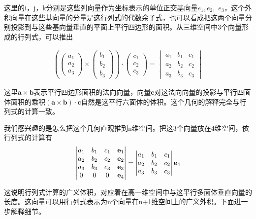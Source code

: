 	这里的i，j，k分别是这些列向量作为坐标表示的单位正交基向量$ e_1,e_2,$  $e_3 $，这个外积向量在这些基向量的分量是这行列式的代数余子式，也可以看成把这两个向量分别投影到与这些基向量垂直的平面上平行四边形的面积。从三维空间中3个向量形成的行列式，可以推出
	
	\begin{gather*}
		\left (  \begin{pmatrix}a_1\\a_2\\a_3 \end{pmatrix} \times \begin{pmatrix}b_1\\b_2\\b_3 \end{pmatrix}\right )\cdot \begin{pmatrix}c_1\\c_2\\c_3 \end{pmatrix} = \begin{vmatrix}a_1&b_1&c_1 \\a_2& b_2&c_2\\a_3&b_3&c_3 \end{vmatrix}
	\end{gather*}

	这里$ \mathbf{a }\times \mathbf{ b} $表示平行四边形面积的法向向量，向量$ \mathbf{c} $对这法向向量的投影与平行四面体面积的乘积$ (\mathbf{a} \times\mathbf{b})\cdot\mathbf{c}$自然是这平行六面体的体积。这个几何的解释完全与行列式的计算一致。
	
	我们感兴趣的是怎么把这个几何直观推到n维空间。把这3个向量放在4维空间，依行列式的计算有
	\begin{gather*}
		\begin{vmatrix}a_1&b_1&c_1 &\textbf e_1\\a_2& b_2&c_2&\textbf e_2\\a_3&b_3&c_3 &\textbf e_3 \\0&0&0 &\textbf e_4\end{vmatrix}  = \begin{vmatrix}a_1&b_1&c_1 \\a_2& b_2&c_2\\a_3&b_3&c_3 \end{vmatrix} \textbf e_4
	\end{gather*}

	这说明行列式计算的广义体积，对应着在高一维空间中与这平行多面体垂直向量的长度。这向量可以用行列式表示为n个向量在n+1维空间上的广义外积。下面进一步解释细节。
	
